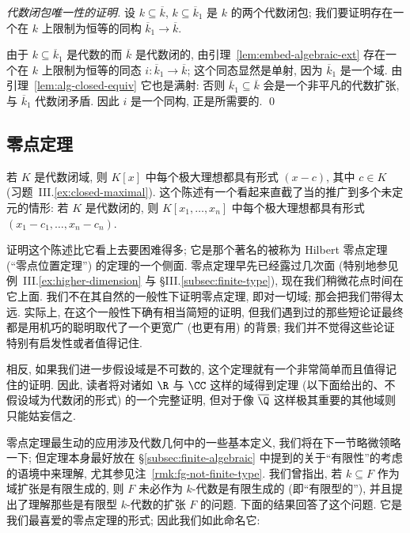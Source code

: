 \noindent\emph{代数闭包唯一性的证明.} 设 $k\subseteq\overline{k}$, $k\subseteq\overline{k}_1$ 是 $k$ 的两个代数闭包; 我们要证明存在一个在 $k$ 上限制为恒等的同构 $\overline{k}_1\to\overline{k}$.

由于 $k\subseteq\overline{k}_1$ 是代数的而 $\overline{k}$ 是代数闭的, 由引理~\ref{lem:embed-algebraic-ext} 存在一个在 $k$ 上限制为恒等的同态 $i:\overline{k}_1\to\overline{k}$; 这个同态显然是单射, 因为 $\overline{k}_1$ 是一个域. 由引理~\ref{lem:alg-closed-equiv} 它也是满射: 否则 $\overline{k}_1\subseteq\overline{k}$ 会是一个非平凡的代数扩张, 与 $\overline{k}_1$ 代数闭矛盾. 因此 $i$ 是一个同构, 正是所需要的. \qed

\subsection{零点定理}
\label{subsec:nullstellensatz}

若 $K$ 是代数闭域, 则 $K[x]$ 中每个极大理想都具有形式 $(x-c)$, 其中 $c\in K$ (习题~III.\ref{ex:closed-maximal}). 这个陈述有一个看起来直截了当的推广到多个未定元的情形: 若 $K$ 是代数闭的, 则 $K[x_1,\ldots ,x_n]$ 中每个极大理想都具有形式 $(x_1-c_1,\ldots ,x_n-c_n)$.

证明这个陈述比它看上去要困难得多; 它是那个著名的被称为 Hilbert 零点定理(``零点位置定理'') 的定理的一个侧面. 零点定理早先已经露过几次面 (特别地参见例~III.\ref{ex:higher-dimension} 与 §III.\ref{subsec:finite-type}), 现在我们稍微花点时间在它上面. 我们不在其自然的一般性下证明零点定理, 即对一切域; 那会把我们带得太远. 实际上, 在这个一般性下确有相当简短的证明, 但我们遇到过的那些短论证最终都是用机巧的聪明取代了一个更宽广 (也更有用) 的背景; 我们并不觉得这些论证特别有启发性或者值得记住.

相反, 如果我们进一步假设域是不可数的, 这个定理就有一个非常简单而且值得记住的证明. 因此, 读者将对诸如 $\R$ 与 $\CC$ 这样的域得到定理 (以下面给出的、不假设域为代数闭的形式) 的一个完整证明, 但对于像 $\overline{\Q}$ 这样极其重要的其他域则只能姑妄信之.

零点定理最生动的应用涉及代数几何中的一些基本定义, 我们将在下一节略微领略一下; 但定理本身最好放在 §\ref{subsec:finite-algebraic} 中提到的关于``有限性''的考虑的语境中来理解, 尤其参见注~\ref{rmk:fg-not-finite-type}. 我们曾指出, 若 $k\subseteq F$ 作为域扩张是有限生成的, 则 $F$ 未必作为 $k$-代数是有限生成的 (即``有限型的''), 并且提出了理解那些是有限型 $k$-代数的扩张 $F$ 的问题. 下面的结果回答了这个问题. 它是我们最喜爱的零点定理的形式; 因此我们如此命名它:

